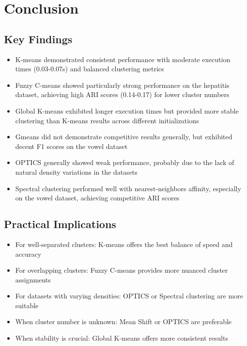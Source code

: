 \section{Conclusion}
\label{sec:conclusion}

\subsection{Key Findings}

\begin{itemize}
    \item K-means demonstrated consistent performance with moderate execution times (0.03-0.07s) and balanced clustering metrics
    \item Fuzzy C-means showed particularly strong performance on the hepatitis dataset, achieving high ARI scores (0.14-0.17) for lower cluster numbers
    \item Global K-means exhibited longer execution times but provided more stable clustering than K-means results across different initializations
    \item Gmeans did not demonstrate competitive results generally, but exhibited decent F1 scores on the vowel dataset
    \item OPTICS generally showed weak performance, probably due to the lack of natural density variations in the datasets
    \item Spectral clustering performed well with nearest-neighbors affinity, especially on the vowel dataset, achieving competitive ARI scores
\end{itemize}

\subsection{Practical Implications}

\begin{itemize}
    \item For well-separated clusters: K-means offers the best balance of speed and accuracy
    \item For overlapping clusters: Fuzzy C-means provides more nuanced cluster assignments
    \item For datasets with varying densities: OPTICS or Spectral clustering are more suitable
    \item When cluster number is unknown: Mean Shift or OPTICS are preferable
    \item When stability is crucial: Global K-means offers more consistent results
\end{itemize}

